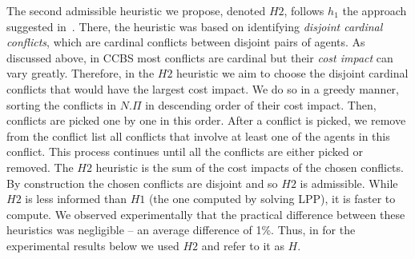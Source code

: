 \documentclass[letterpaper]{article} %
\newcommand{\ccbs}{\ac{CCBS}\xspace}
\begin{document}

The second admissible heuristic we propose, denoted $H2$, follows $h_1$ the approach suggested in~\cite{felner2018adding}.
There, the heuristic was based on identifying \emph{disjoint cardinal conflicts}, which are cardinal conflicts between disjoint pairs of agents.
As discussed above, in \ccbs most conflicts are cardinal but their \emph{cost impact} can vary greatly.
Therefore, in the $H2$ heuristic we aim to choose the disjoint cardinal conflicts that would have the largest cost impact. We do so in a greedy manner, sorting the conflicts in $N.\Pi$ in descending order of their cost impact. Then, conflicts are picked one by one in this order.
After a conflict is picked, we remove from the conflict list all conflicts that involve at least one of the agents in this conflict. This process continues until all the conflicts are either picked or removed.
The $H2$ heuristic is the sum of the cost impacts of the chosen conflicts.
By construction the chosen conflicts are disjoint and so $H2$ is admissible.
While $H2$ is less informed than $H1$ (the one computed by solving LPP), it is faster to compute.
We observed experimentally that the practical difference between these heuristics was negligible -- an average difference of 1\%.
Thus, in for the experimental results below we used $H2$ and refer to it as $H$.

\end{document}
